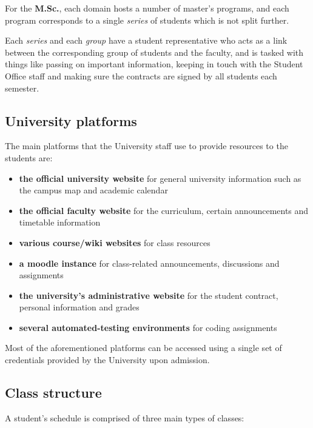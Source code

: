         For the \textbf{M.Sc.}, each domain hosts a number of master's programs, and each program corresponds to a single \textit{series} of students which is not split further.
        
        Each \textit{series} and each \textit{group} have a student representative who acts as a link between the corresponding group of students and the faculty, and is tasked with things like passing on important information, keeping in touch with the Student Office staff and making sure the contracts are signed by all students each semester.
    
    \subsection{University platforms} \label{1:university_platforms}
    
        The main platforms that the University staff use to provide resources to the students are:
        
        \begin{itemize}
            \item \textbf{the official university website} for general university information such as the campus map and academic calendar
            \item \textbf{the official faculty website} for the curriculum, certain announcements and timetable information
            \item \textbf{various course/wiki websites} for class resources
            \item \textbf{a \gls{moodle} instance} for class-related announcements, discussions and assignments
            \item \textbf{the university's administrative website} for the student contract, personal information and grades
            \item \textbf{several automated-testing environments} for coding assignments
        \end{itemize}
    
        Most of the aforementioned platforms can be accessed using a single set of credentials provided by the University upon admission.
        
    \subsection{Class structure} \label{1:class_structure}
    
    A student's schedule is comprised of three main types of classes:
    
